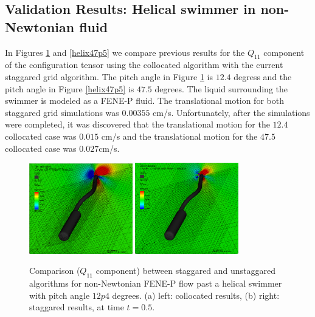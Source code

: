 \documentclass[]{article}
\begin{document}
\subsection{Validation Results: Helical swimmer in non-Newtonian fluid } 

In Figures \ref{helix12p4} and \ref{helix47p5} we compare previous 
results for the $Q_{11}$ component of the configuration tensor
using the collocated algorithm with the current staggared
grid algorithm.  The pitch angle in Figure \ref{helix12p4} is 
$12.4$ degress and the pitch angle in Figure \ref{helix47p5} is
$47.5$ degrees.  The liquid surrounding the swimmer is modeled as a 
FENE-P fluid.  The translational motion for both staggared grid
simulations was $0.00355$ cm/s.  Unfortunately, after the simulations
were completed, it was discovered that the translational motion for the
$12.4$ collocated case was $0.015$ cm/s and the translational
motion for the $47.5$ collocated case was $0.027$cm/s.

\begin{figure}[htpb]
\centering
\includegraphics[width=0.4\textwidth]{collocated_12p4.png}
\includegraphics[width=0.4\textwidth]{staggared_12p4.png}
\caption{Comparison ($Q_{11}$ component) between staggared and 
    	unstaggared algorithms for 
        non-Newtonian FENE-P flow past a helical swimmer with pitch angle
        $12p4$ degrees.
	(a) left: collocated results, (b) right: staggared results,
	at time $t=0.5$. \label{helix12p4} }
\end{figure}
\end{document}
